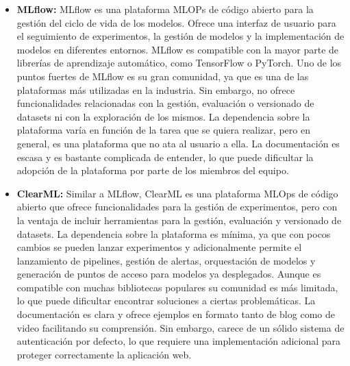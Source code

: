 \begin{itemize}
    \item \textbf{MLflow:} MLflow \cite{WhatMLflow} es una plataforma MLOPs de código abierto para la gestión del ciclo de vida de
    los modelos. Ofrece una interfaz de usuario para el seguimiento de experimentos, la gestión de modelos 
    y la implementación de modelos en diferentes entornos. MLflow es compatible con la mayor parte de librerías de aprendizaje 
    automático, como TensorFlow o PyTorch. Uno de los puntos fuertes de MLflow es su gran comunidad, ya que es
    una de las plataformas más utilizadas en la industria. Sin embargo, no ofrece funcionalidades relacionadas con
    la gestión, evaluación o versionado de datasets ni con la exploración de los mismos. La dependencia sobre la
    plataforma varía en función de la tarea que se quiera realizar, pero en general, es una plataforma que no
    ata al usuario a ella. La documentación es escasa y es bastante complicada de entender, lo que puede
    dificultar la adopción de la plataforma por parte de los miembros del equipo.
    
    \item \textbf{ClearML:} Similar a MLflow, ClearML \cite{WhatClearML} es una plataforma MLOps de código abierto que ofrece funcionalidades para la 
    gestión de experimentos, pero con la ventaja de incluir herramientas para la gestión, evaluación y 
    versionado de datasets. La dependencia sobre la plataforma es mínima, ya que con pocos cambios se pueden 
    lanzar experimentos y adicionalmente permite el lanzamiento de pipelines, gestión de alertas, orquestación de modelos 
    y generación de puntos de acceso para modelos ya desplegados. Aunque es compatible con muchas bibliotecas populares su comunidad 
    es más limitada, lo que puede dificultar encontrar soluciones a ciertas problemáticas.
    La documentación es clara y ofrece ejemplos en formato tanto de blog como de video facilitando su 
    comprensión. Sin embargo, carece de un sólido sistema de autenticación por defecto, lo que requiere una
    implementación adicional para proteger correctamente la aplicación web.
    

\end{itemize}
